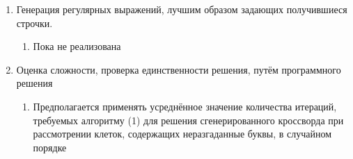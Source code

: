 \documentclass[12pt]{article}
\begin{document}
\begin{enumerate}
\begin{enumerate}
\end{enumerate} 
\item Генерация регулярных выражений, лучшим образом задающих получившиеся строчки.
\begin{enumerate} 
\item Пока не реализована
\end{enumerate} 
\item Оценка сложности, проверка единственности решения, путём программного решения
\begin{enumerate} 
\item Предполагается применять усреднённое значение количества итераций, требуемых алгоритму (1) для решения сгенерированного кроссворда при рассмотрении клеток, содержащих неразгаданные буквы, в случайном порядке
\end{enumerate} 
\end{enumerate} 


    \newpage %

    \newpage %
    

    \newpage %


    

        
\end{document}
